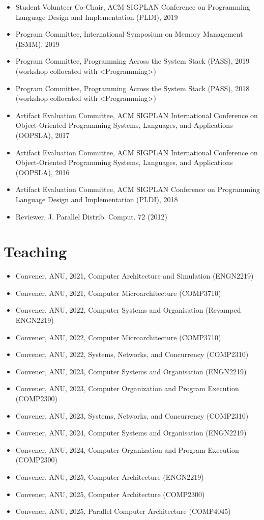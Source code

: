 \documentclass[singlecolumn,singlespace,11pt]{article}
\begin{document}
\begin{itemize}
\item Student Volunteer Co-Chair, ACM SIGPLAN Conference on Programming Language Design and Implementation (PLDI), 2019
\item Program Committee, International Symposium on Memory Management (ISMM), 2019
\item Program Committee, Programming Across the System Stack (PASS), 2019 (workshop collocated with <Programming>) 
\item Program Committee, Programming Across the System Stack (PASS), 2018 (workshop collocated with  <Programming>) 
\item Artifact Evaluation Committee, ACM SIGPLAN International Conference on Object-Oriented Programming Systems, Languages, and Applications (OOPSLA), 2017  
\item Artifact Evaluation Committee, ACM SIGPLAN International Conference on Object-Oriented Programming Systems, Languages, and Applications (OOPSLA), 2016  
\item Artifact Evaluation Committee, ACM SIGPLAN Conference on Programming Language Design and Implementation (PLDI), 2018
\item Reviewer, J. Parallel Distrib. Comput. 72 (2012) 
\end{itemize}

\section*{Teaching}
\begin{itemize}
\item Convener, ANU, 2021, Computer Architecture and Simulation (ENGN2219)
\item Convener, ANU, 2021, Computer Microarchitecture (COMP3710) 
\item Convener, ANU, 2022, Computer Systems and Organisation (Revamped ENGN2219)
\item Convener, ANU, 2022, Computer Microarchitecture (COMP3710) 
\item Convener, ANU, 2022, Systems, Networks, and Concurrency (COMP2310) 
\item Convener, ANU, 2023, Computer Systems and Organisation (ENGN2219) 
\item Convener, ANU, 2023, Computer Organization and Program Execution (COMP2300) 
\item Convener, ANU, 2023, Systems, Networks, and Concurrency (COMP2310) 
\item Convener, ANU, 2024, Computer Systems and Organisation (ENGN2219) 
\item Convener, ANU, 2024, Computer Organization and Program Execution (COMP2300)
\item Convener, ANU, 2025, Computer Architecture (ENGN2219) 
\item Convener, ANU, 2025, Computer Architecture (COMP2300)
\item Convener, ANU, 2025, Parallel Computer Architecture (COMP4045) 
\end{itemize}
\end{document}
